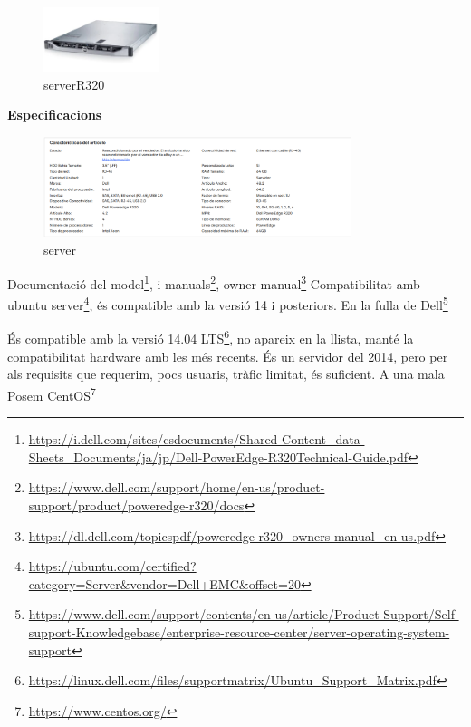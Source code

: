 \documentclass[
  10pt,
]{krantz}
\DeclareRobustCommand{\href}[2]{#2\footnote{\url{#1}}}
\begin{document}
\begin{figure}
\centering
\includegraphics[width=0.3\textwidth,height=\textheight]{imatges/serverR320.png}
\caption{serverR320}
\end{figure}

\textbf{Especificacions}

\begin{figure}
\centering
\includegraphics[width=0.8\textwidth,height=\textheight]{imatges/server_hp.png}
\caption{server}
\end{figure}

\begin{rmdnote}{}
\href{https://i.dell.com/sites/csdocuments/Shared-Content_data-Sheets_Documents/ja/jp/Dell-PowerEdge-R320Technical-Guide.pdf}{Documentació del model}, i \href{https://www.dell.com/support/home/en-us/product-support/product/poweredge-r320/docs}{manuals}, \href{https://dl.dell.com/topicspdf/poweredge-r320_owners-manual_en-us.pdf}{owner manual} Compatibilitat amb \href{https://ubuntu.com/certified?category=Server\&vendor=Dell+EMC\&offset=20}{ubuntu server}, és compatible amb la versió 14 i posteriors. En la fulla de \href{https://www.dell.com/support/contents/en-us/article/Product-Support/Self-support-Knowledgebase/enterprise-resource-center/server-operating-system-support}{Dell}

\end{rmdnote}

\begin{rmdinfo}{}
És compatible amb la \href{https://linux.dell.com/files/supportmatrix/Ubuntu_Support_Matrix.pdf}{versió 14.04 LTS}, no apareix en la llista, manté la compatibilitat hardware amb les més recents. És un servidor del 2014, pero per als requisits que requerim, pocs usuaris, tràfic limitat, és suficient. A una mala Posem \href{https://www.centos.org/}{CentOS}

\end{rmdinfo}
\end{document}
